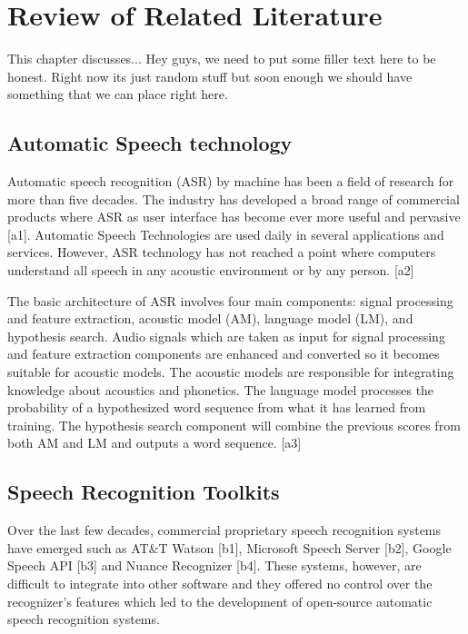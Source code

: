 
\chapter{Review of Related Literature}

This chapter discusses... Hey guys, we need to put some filler text here to be honest. Right now its just random stuff but soon enough we should have something that we can place right here.

\section{Automatic Speech technology}

Automatic speech recognition (ASR) by machine has been a field of research for more than five decades. The industry has developed a broad range of commercial products where ASR as user interface has become ever more useful and pervasive [a1]. Automatic Speech Technologies are used daily in several applications and services. However, ASR technology has not reached a point where computers understand all speech in any acoustic environment or by any person. [a2]

The basic architecture of ASR involves four main components: signal processing and feature extraction, acoustic model (AM), language model (LM), and hypothesis search. Audio signals which are taken as input for signal processing and feature extraction components are enhanced and converted so it becomes suitable for acoustic models. The acoustic models are responsible for integrating knowledge about acoustics and phonetics. The language model processes the probability of a hypothesized word sequence from what it has learned from training. The hypothesis search component will combine the previous scores from both AM and LM and outputs a word sequence. [a3]

\section{Speech Recognition Toolkits}

Over the last few decades, commercial proprietary speech recognition systems have emerged such as AT&T Watson [b1], Microsoft Speech Server [b2], Google Speech API [b3] and Nuance Recognizer [b4]. These systems, however, are difficult to integrate into other software and they offered no control over the recognizer’s features which led to the development of open-source automatic speech recognition systems.  

